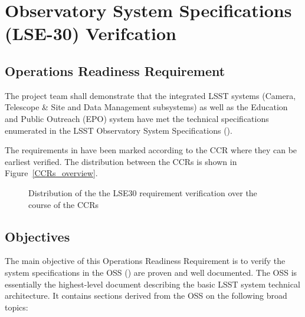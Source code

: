 \section{Observatory System Specifications (LSE-30) Verifcation}  \label{sec:oss}

\subsection{Operations Readiness Requirement}
The project team shall demonstrate that the integrated LSST systems (Camera, Telescope \& Site and Data Management subsystems) as well as the Education and Public Outreach (EPO) system have met the technical specifications enumerated in the LSST Observatory System Specifications ().

The requirements in  have been marked according to the CCR where they can be earliest verified. 
The distribution between the CCRs is shown in Figure~\ref{CCRs_overview}.

\begin{figure}[htbp]
\begin{center}
\caption{Distribution of the the LSE30 requirement verification over the course of the CCRs}
\label{LSE30_CCRdistribution}
\end{center}
\end{figure}


\subsection{Objectives}
The main objective of this Operations Readiness Requirement is to verify the system specifications in the OSS () are proven and well documented. The OSS is essentially the highest-level document describing the basic LSST system technical architecture. It contains sections derived from the OSS on the following broad topics:

